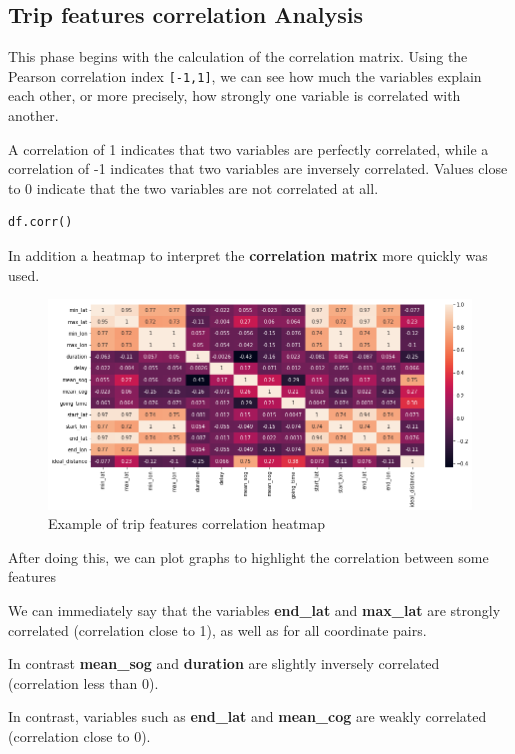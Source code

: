 \subsection{Trip features correlation Analysis}

This phase begins with the calculation of the correlation matrix. Using the Pearson correlation index \verb|[-1,1]|, we can see how much the variables explain each other, or more precisely, how strongly one variable is correlated with another.

A correlation of 1 indicates that two variables are perfectly correlated, while a correlation of -1 indicates that two variables are inversely correlated. Values close to 0 indicate that the two variables are not correlated at all.

\begin{lstlisting}[language=Python]
df.corr()
\end{lstlisting}

In addition a heatmap to interpret the \textbf{correlation matrix} more quickly was used.

\begin{figure}[H]
    \centering
    \includegraphics[width=17cm]{Images/1/heatmap.png}
    \caption{Example of trip features correlation heatmap}
\end{figure}

After doing this, we can plot graphs to highlight the correlation between some features

We can immediately say that the variables \textbf{end\_lat} and \textbf{max\_lat} are strongly correlated (correlation close to 1), as well as for all coordinate pairs.

In contrast \textbf{mean\_sog} and \textbf{duration} are slightly inversely correlated (correlation less than 0).

In contrast, variables such as \textbf{end\_lat} and \textbf{mean\_cog} are weakly correlated (correlation close to 0).

